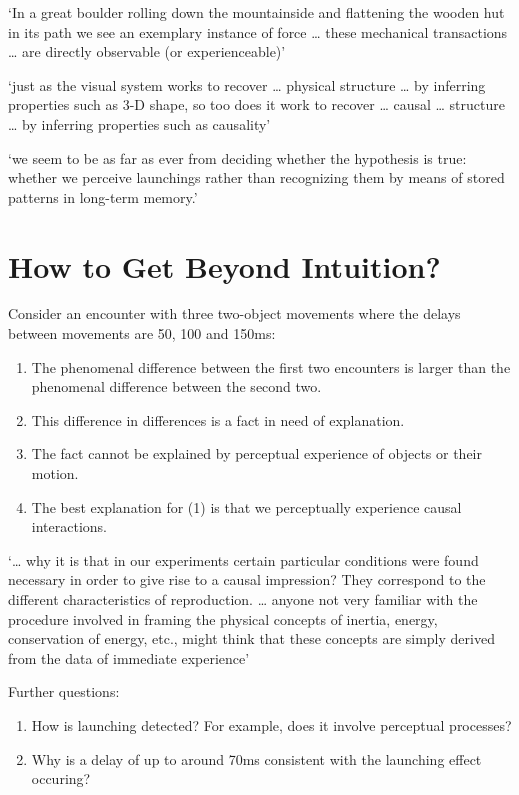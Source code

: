 \documentclass[12pt]{extarticle}
\begin{document}
\begin{multicols*}{3}
‘In a great boulder rolling down the mountainside and flattening the wooden hut in its path we see an exemplary instance of force … these mechanical transactions … are directly observable (or experienceable)’
\citep[p.~118]{Strawson:1992yh}

‘just as the visual system works to recover … physical structure … by inferring properties such as 3-D shape, so too does it work to recover … causal … structure … by inferring properties such as causality’
\citep[p.~299]{Scholl:2000eq}

‘we seem to be as far as ever from deciding whether the hypothesis is
true: whether we perceive launchings rather than recognizing them by
means of stored patterns in long-term memory.’
\citep[p.~92]{rips:2011_causation}




\section{How to Get Beyond Intuition?}


Consider an encounter with three two-object movements where the delays between movements are 50, 100 and 150ms:
\begin{enumerate}
\item The phenomenal difference between the first two encounters is larger than the phenomenal difference between the second two.
\item This difference in differences is a fact in need of explanation.
\item The fact cannot be explained by perceptual experience of objects or their motion.
\item The best explanation for (1) is that we perceptually experience causal interactions.
\end{enumerate}

‘… why it is that in our experiments certain particular conditions were
found necessary in order to give rise to a causal impression? They
correspond to the different characteristics of reproduction. …
anyone not very familiar with the procedure involved in framing the
physical concepts of inertia, energy, conservation of energy, etc., might
think that these concepts are simply derived from the data of immediate
experience’
\citep{Michotte:1946nz}

Further questions:
\begin{enumerate}
  \item How is launching detected? For example, does it involve perceptual processes?
\item Why is a delay of up to around 70ms consistent with the launching effect occuring?
\end{enumerate}




\end{multicols*}
\end{document}

